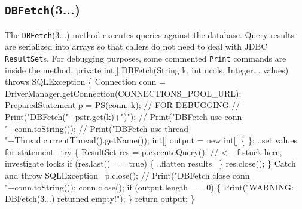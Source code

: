 \documentclass{article}
\def\nwendcode{\endtrivlist \endgroup}      %
\theoremstyle{definition}                   %
\begin{document}
\subsection{{\tt{}\protect{}DBFetch}(3...)}
The {\tt{}\protect{}DBFetch}(3...) method executes queries against the database.  Query
results are serialized into arrays so that callers do not need to deal with
JDBC {\tt{}ResultSet}s. For debugging purposes, some commented {\tt{}\protect{}Print} commands
are inside the method.
\nwenddocs{}\endmoddef{}
private int[] DBFetch(String k, int ncols, Integer... values) throws SQLException \{
  Connection conn = DriverManager.getConnection(CONNECTIONS_POOL_URL);
  PreparedStatement p = PS(conn, k);
  // FOR DEBUGGING
  // Print("DBFetch("+pstr.get(k)+")");
  // Print("DBFetch use conn "+conn.toString());
  // Print("DBFetch use thread "+Thread.currentThread().getName());
  int[] output = new int[] \{ \};
  \LA{}..set values for statement~{\nwtagstyle{}}\RA{}
  try \{
    ResultSet res = p.executeQuery();  // <-- if stuck here, investigate locks
    if (res.last() == true) \{
      \LA{}..flatten results~{\nwtagstyle{}}\RA{}
    \}
    res.close();
  \}
  \LA{}Catch and throw \code{}SQLException\edoc{}~{\nwtagstyle{}}\RA{}
  p.close();
  // Print("DBFetch close conn "+conn.toString());
  conn.close();
  if (output.length == 0) \{
    Print("WARNING: DBFetch(3...) returned empty!");
  \}
  return output;
\}
\eatline
{}\nwendcode{}\endmoddef{}
\end{document}
